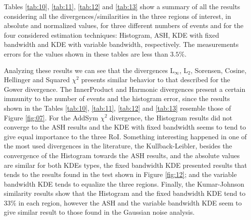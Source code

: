 \documentclass[conference]{IEEEtran}
\begin{document}

Tables \ref{tab:10}, \ref{tab:11}, \ref{tab:12} and \ref{tab:13} show a summary of all the results considering all the divergences/similarities in the three regions of interest, in absolute and normalized values, for three different numbers of events and for the four considered estimation techniques: Histogram, ASH, KDE with fixed bandwidth and KDE with variable bandwidth, respectively. The measurements errors for the values shown in these tables are less than $3.5\%$.

Analyzing these results we can see that the divergences L$_{\infty}$, L$_{2}$, Sorensen, Cosine, Hellinger and Squared $\chi^2$ presents similar behavior to that described for the Gower divergence. The InnerProduct and Harmonic divergences present a certain immunity to the number of events and the histogram error, since the results shown in the Tables \ref{tab:10}, \ref{tab:11}, \ref{tab:12} and \ref{tab:13} resemble those of Figure \ref{fig:07}. For the AddSym $\chi^2$ divergence, the Histogram results did not converge to the ASH results and the KDE with fixed bandwidth seems to tend to give equal importance to the three RoI. Something interesting happened in one of the most used divergences in the literature, the Kullback-Leibler, besides the convergence of the Histogram towards the ASH results, and the absolute values are similar for both KDEs types, the fixed bandwidth KDE presented results that tends to the results found in the test shown in Figure \ref{fig:12}; and the variable bandwidth KDE tends to equalize the three regions. Finally, the Kumar-Johnson similarity results show that the Histogram and the fixed bandwidth KDE tend to $33\%$ in each region, however the ASH and the variable bandwidth KDE seem to give similar result to those found in the Gaussian noise analysis.
\end{document}
